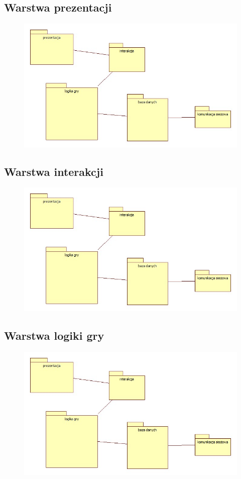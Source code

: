 \documentclass[a4paper, 11pt]{article}
\begin{document}
	\subsection{Warstwa prezentacji}	
	\begin{figure}[H]%
		\includegraphics[scale=0.5]{uml/main.jpg}
	\end{figure}
	\subsection{Warstwa interakcji}
	\begin{figure}[H]%
		\includegraphics[scale=0.5]{uml/main.jpg}
	\end{figure}	
	\subsection{Warstwa logiki gry}	
	\begin{figure}[H]%
		\includegraphics[scale=0.5]{uml/main.jpg}
	\end{figure}
\end{document}
